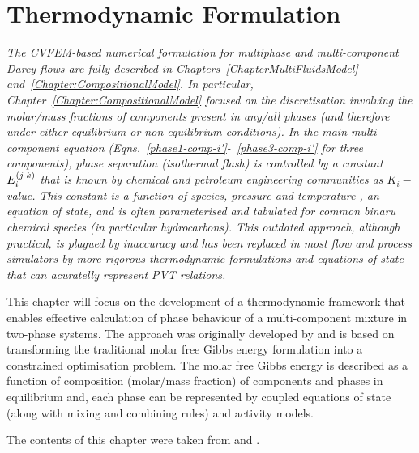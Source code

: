 
\chapter{Thermodynamic Formulation}\label{Chapter:ThermodynamicFormulation}

\begin{adjustwidth}{1cm}{1cm}
    {\it The CVFEM-based numerical formulation for multiphase and multi-component Darcy flows are fully described in Chapters~\ref{ChapterMultiFluidsModel} and~\ref{Chapter:CompositionalModel}. In particular, Chapter~\ref{Chapter:CompositionalModel} focused on the discretisation involving the molar/mass fractions of components present in any/all phases (and therefore under either equilibrium or non-equilibrium conditions). In the main multi-component equation (\eg Eqns.~\ref{phase1-comp-i'}-~\ref{phase3-comp-i'} for three components), phase separation (\ie isothermal flash) is controlled by a constant $\mfr[E]{i}{j\; k}$ that is known by chemical and petroleum engineering communities as $K_{i}-$value. This constant is a function of species, pressure and temperature \citep{SmithVanNess_Book}, \ie an equation of state, and is often parameterised and tabulated for common binaru chemical species (in particular hydrocarbons). This outdated approach, although practical, is plagued by inaccuracy and has been replaced in most flow and process simulators by more rigorous thermodynamic formulations and equations of state that can acuratelly represent PVT relations.

This chapter will focus on the development of a thermodynamic framework that enables effective calculation of phase behaviour of a multi-component mixture in two-phase systems. The approach was originally developed by \citet{Henderson_Thesis} and is based on transforming the traditional molar free Gibbs energy formulation into a constrained optimisation problem. The molar free Gibbs energy is described as a function of composition (molar/mass fraction) of components and phases in equilibrium and, each phase can be represented by coupled equations of state (along with mixing and combining rules) and activity models. 
\medskip

The contents of this chapter were taken from \citet{Henderson_Thesis} and \citet{Gomes_MSc_1999} \citep[see also][]{Henderson_2001,michelsen_1984,gomes_2001}.
}
\end{adjustwidth}

